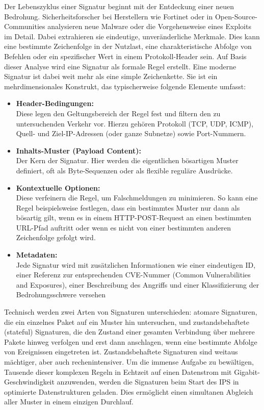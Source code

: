 Der Lebenszyklus einer Signatur beginnt mit der Entdeckung einer neuen Bedrohung. Sicherheitsforscher bei Herstellern wie Fortinet oder in Open-Source-Communities analysieren neue Malware oder die Vorgehensweise eines Exploits im Detail. Dabei extrahieren sie eindeutige, unveränderliche Merkmale. Dies kann eine bestimmte Zeichenfolge in der Nutzlast, eine charakteristische Abfolge von Befehlen oder ein spezifischer Wert in einem Protokoll-Header sein. Auf Basis dieser Analyse wird eine Signatur als formale Regel erstellt. Eine moderne Signatur ist dabei weit mehr als eine simple Zeichenkette. Sie ist ein mehrdimensionales Konstrukt, das typischerweise folgende Elemente umfasst:\\
\begin{itemize}
	\item \textbf{Header-Bedingungen:} \\Diese legen den Geltungsbereich der Regel fest und filtern den zu untersuchenden Verkehr vor. Hierzu gehören Protokoll (TCP, UDP, ICMP), Quell- und Ziel-IP-Adressen (oder ganze Subnetze) sowie Port-Nummern.\\
	\item \textbf{Inhalts-Muster (Payload Content):} \\Der Kern der Signatur. Hier werden die eigentlichen bösartigen Muster definiert, oft als Byte-Sequenzen oder als flexible reguläre Ausdrücke.\\
	\item \textbf{Kontextuelle Optionen: } \\Diese verfeinern die Regel, um Falschmeldungen zu minimieren. So kann eine Regel beispielsweise festlegen, dass ein bestimmtes Muster nur dann als bösartig gilt, wenn es in einem HTTP-POST-Request an einen bestimmten URL-Pfad auftritt oder wenn es nicht von einer bestimmten anderen Zeichenfolge gefolgt wird.\\
	\item \textbf{Metadaten:} \\Jede Signatur wird mit zusätzlichen Informationen wie einer eindeutigen ID, einer Referenz zur entsprechenden CVE-Nummer (Common Vulnerabilities and Exposures), einer Beschreibung des Angriffs und einer Klassifizierung der Bedrohungsschwere versehen
\end{itemize}

Technisch werden zwei Arten von Signaturen unterschieden: atomare Signaturen, die ein einzelnes Paket auf ein Muster hin untersuchen, und zustandsbehaftete (stateful) Signaturen, die den Zustand einer gesamten Verbindung über mehrere Pakete hinweg verfolgen und erst dann anschlagen, wenn eine bestimmte Abfolge von Ereignissen eingetreten ist. Zustandsbehaftete Signaturen sind weitaus mächtiger, aber auch rechenintensiver. Um die immense Aufgabe zu bewältigen, Tausende dieser komplexen Regeln in Echtzeit auf einen Datenstrom mit Gigabit-Geschwindigkeit anzuwenden, werden die Signaturen beim Start des IPS in optimierte Datenstrukturen geladen. Dies ermöglicht einen simultanen Abgleich aller Muster in einem einzigen Durchlauf.\\

